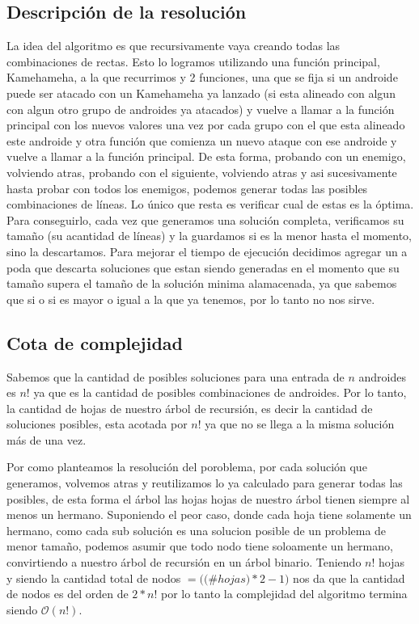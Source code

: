 \documentclass[10pt,a4paper]{article}
\begin{document}
\subsection{Descripción de la resolución}
La idea del algoritmo es que recursivamente vaya creando todas las combinaciones de rectas. Esto lo logramos utilizando una función principal, Kamehameha, a la que recurrimos y 2 funciones, una que se fija si un androide puede ser atacado con un Kamehameha ya lanzado (si esta alineado con algun con algun otro grupo de androides ya atacados) y vuelve a llamar a la función principal con los nuevos valores una vez por cada grupo con el que esta alineado este androide y otra función que comienza un nuevo ataque con ese androide y vuelve a llamar a la función principal. De esta forma, probando con un enemigo, volviendo atras, probando con el siguiente, volviendo atras y asi sucesivamente hasta probar con todos los enemigos, podemos generar todas las posibles combinaciones de líneas. Lo único que resta es verificar cual de estas es la óptima. Para conseguirlo, cada vez que generamos una solución completa, verificamos su tamaño (su acantidad de líneas) y la guardamos si es la menor hasta el momento, sino la descartamos.
Para mejorar el tiempo de ejecución decidimos agregar un a poda que descarta soluciones que estan siendo generadas en el momento que su tamaño supera el tamaño de la solución minima alamacenada, ya que sabemos que si o si es mayor o igual a la que ya tenemos, por lo tanto no nos sirve.

\subsection{Cota de complejidad}
Sabemos que la cantidad de posibles soluciones para una entrada de $n$ androides es $n!$ ya que es la cantidad de posibles combinaciones de androides. Por lo tanto, la cantidad de hojas de nuestro árbol de recursión, es decir la cantidad de soluciones posibles, esta acotada por $n!$ ya que no se llega a la misma solución más de una vez.

Por como planteamos la resolución del poroblema, por cada solución que generamos, volvemos atras y reutilizamos lo ya calculado para generar todas las posibles, de esta forma el árbol las hojas hojas de nuestro árbol tienen siempre al menos un hermano. Suponiendo el peor caso, donde cada hoja tiene solamente un hermano, como cada sub solución es una solucion posible de un problema de menor tamaño, podemos asumir que todo nodo tiene soloamente un hermano, convirtiendo a nuestro árbol de recursión en un árbol binario. Teniendo $n!$ hojas y siendo la cantidad total de nodos $= (($\#$hojas)*2 - 1)$ nos da que la cantidad de nodos es del orden de $2*n!$ por lo tanto la complejidad del algoritmo termina siendo $\mathcal{O}(n!)$.
\end{document}
